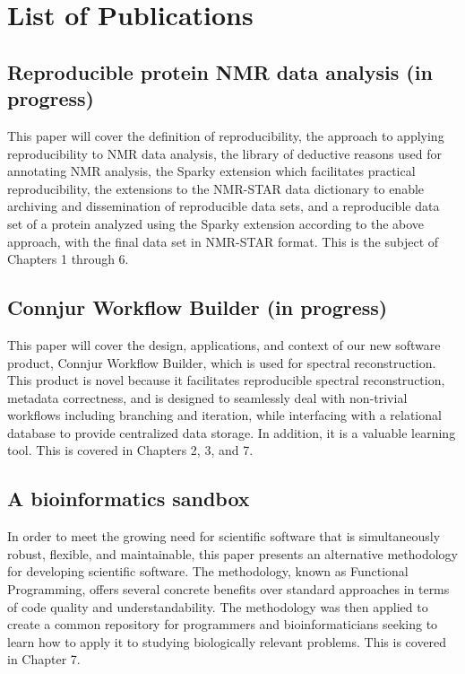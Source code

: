 \chapter{List of Publications}

\section{Reproducible protein NMR data analysis (in progress)}
This paper will cover the definition of reproducibility, the approach to
applying reproducibility to NMR data analysis, the library of deductive
reasons used for annotating NMR analysis, the Sparky extension which 
facilitates practical reproducibility, the extensions to the NMR-STAR
data dictionary to enable archiving and dissemination of reproducible
data sets, and a reproducible data set of a protein analyzed using the Sparky
extension according to the above approach, with the final data set in 
NMR-STAR format.  This is the subject of Chapters 1 through 6.


\section{Connjur Workflow Builder (in progress)}
This paper \cite{connjur-wb} will cover the design, applications, and context
of our new software product, Connjur Workflow Builder, which is used for
spectral reconstruction.  This product is novel because it facilitates 
reproducible spectral reconstruction, metadata correctness, and is designed
to seamlessly deal with non-trivial workflows including branching and 
iteration, while interfacing with a relational database to provide centralized
data storage.  In addition, it is a valuable learning tool.  This is covered
in Chapters 2, 3, and 7.


\section{A bioinformatics sandbox}
In order to meet the growing need for scientific software that is 
simultaneously robust, flexible, and maintainable, this paper 
\cite{fenwick2012} presents an alternative methodology for developing scientific
software.  The methodology, known as Functional Programming, offers several
concrete benefits over standard approaches in terms of code quality and
understandability.  The methodology was then applied to create a common 
repository for programmers and bioinformaticians seeking to learn how to apply
it to studying biologically relevant problems.  This is covered in Chapter 7.


